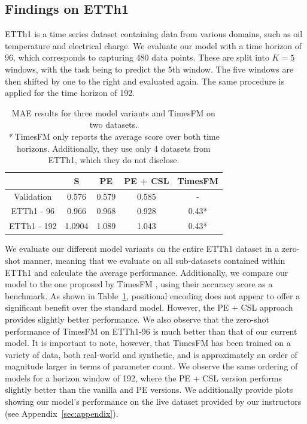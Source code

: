 \documentclass{article}
\theoremstyle{plain}
\theoremstyle{definition}
\theoremstyle{remark}
\begin{document}
\subsection{Findings on ETTh1}
ETTh1 is a time series dataset containing data from various domains, such as oil temperature and electrical charge. We evaluate our model with a time horizon of 96, which corresponds to capturing 480 data points. These are split into $K=5$ windows, with the task being to predict the 5th window. 
The five windows are then shifted by one to the right and evaluated again.
The same procedure is applied for the time horizon of 192.
\begin{table}[h!]
    \centering
    \begin{tabular}{|c|c|c|c|c|}
    \hline
    \textbf{} & S & PE & PE + CSL & TimesFM \\ \hline 
    Validation   & 0.576             & 0.579             & 0.585             & -       \\ \hline
    ETTh1 - 96   & 0.966             & 0.968            & 0.928      &0.43*             \\ \hline
    ETTh1 - 192  & 1.0904            & 1.089            & 1.043            & 0.43*                     \\ \hline

\end{tabular}
    \caption{MAE results for three model variants and TimesFM on two datasets.\\
    \textit{*} TimesFM \cite{das2024decoderonlyfoundationmodeltimeseries} only reports the average score over both time horizons. Additionally, they use only 4 datasets from ETTh1, which they do not disclose.
    }
    \label{tab:evaluation_results}
\end{table}
We evaluate our different model variants on the entire ETTh1 dataset in a zero-shot manner, meaning that we evaluate on all sub-datasets contained within ETTh1 and calculate the average performance.
Additionally, we compare our model to the one proposed by TimesFM \cite{das2024decoderonlyfoundationmodeltimeseries}, using their accuracy score as a benchmark.
As shown in Table~\ref{tab:evaluation_results}, positional encoding does not appear to offer a significant benefit over the standard model. However, the PE + CSL approach provides slightly better performance. We also observe that the zero-shot performance of TimesFM on ETTh1-96 is much better than that of our current model. It is important to note, however, that TimesFM has been trained on a variety of data, both real-world and synthetic, and is approximately an order of magnitude larger in terms of parameter count.
We observe the same ordering of models for a horizon window of 192, where the PE + CSL version performs slightly better than the vanilla and PE versions. We additionally provide plots showing our model's performance on the live dataset provided by our instructors (see Appendix~\ref{sec:appendix}).
\end{document}
